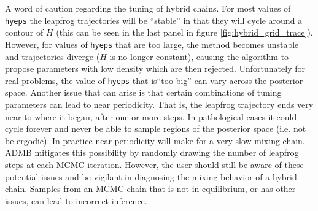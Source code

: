 \documentclass{article}\usepackage[]{graphicx}\usepackage[]{color}
\begin{document}
A word of caution regarding the tuning of hybrid chains. For
most values of \texttt{hyeps} the leapfrog trajectories will
be ``stable'' in that they will cycle around a contour of
$H$ (this can be seen in the last panel in figure
\ref{fig:hybrid_grid_trace}). However, for values of
\texttt{hyeps} that are too large, the method becomes
unstable and trajectories diverge ($H$ is no longer
constant), causing the algorithm to propose parameters with
low density which are then rejected. Unfortunately for real
problems, the value of \texttt{hyeps} that is``too big'' can
vary across the posterior space.  Another issue that can
arise is that certain combinations of tuning parameters can
lead to near periodicity. That is, the leapfrog trajectory
ends very near to where it began, after one or more
steps. In pathological cases it could cycle forever and
never be able to sample regions of the posterior space
(i.e. not be ergodic). In practice near periodicity will
make for a very slow mixing chain. ADMB mitigates this
possibility by randomly drawing the number of leapfrog steps
at each MCMC iteration. However, the user should still be
aware of these potential issues and be vigilant in
diagnosing the mixing behavior of a hybrid chain. Samples
from an MCMC chain that is not in equilibrium, or has other
issues, can lead to incorrect inference.



\end{document}
